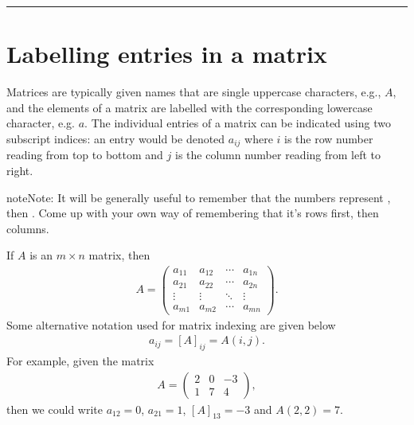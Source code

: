 \documentclass[letterpaper,10pt,english]{jupyterBook}
\begin{document}
\bigskip\hrule\bigskip



\section{Labelling entries in a matrix}
\label{\detokenize{_pages/1.0_Matrices:labelling-entries-in-a-matrix}}\label{\detokenize{_pages/1.0_Matrices:indexing-a-matrix-section}}
\sphinxAtStartPar
Matrices are typically given names that are single uppercase characters, e.g., \(A\), and the elements of a matrix are labelled with the corresponding lowercase character, e.g. \(a\). The individual entries of a matrix can be indicated using two subscript indices: an entry would be denoted \(a_{ij}\) where \(i\) is the row number reading from top to bottom and \(j\) is the column number reading from left to right.

\begin{sphinxadmonition}{note}{Note:}
\sphinxAtStartPar
It will be generally useful to remember that the numbers represent , then . Come up with your own way of remembering that it’s rows first, then columns.
\end{sphinxadmonition}

\sphinxAtStartPar
If \(A\) is an \(m \times n\) matrix, then
\begin{equation*}
\begin{split} A =
\begin{pmatrix}
    a_{11} & a_{12} & \cdots & a_{1n} \\
    a_{21} & a_{22} & \cdots & a_{2n} \\
    \vdots & \vdots & \ddots & \vdots \\
    a_{m1} & a_{m2} & \cdots & a_{mn}
\end{pmatrix}. \end{split}
\end{equation*}
\sphinxAtStartPar
Some alternative notation used for matrix indexing are given below
\begin{equation*}
\begin{split} a_{ij} = [A]_{ij} = A(i,j). \end{split}
\end{equation*}
\sphinxAtStartPar
For example, given the matrix
\begin{equation*}
\begin{split}A = \begin{pmatrix} 2 & 0 & -3 \\ 1 & 7 & 4 \end{pmatrix},\end{split}
\end{equation*}
\sphinxAtStartPar
then we could write \(a_{12} = 0\), \(a_{21} = 1\), \([A]_{13} = -3\) and \(A(2,2) = 7\).
\end{document}

